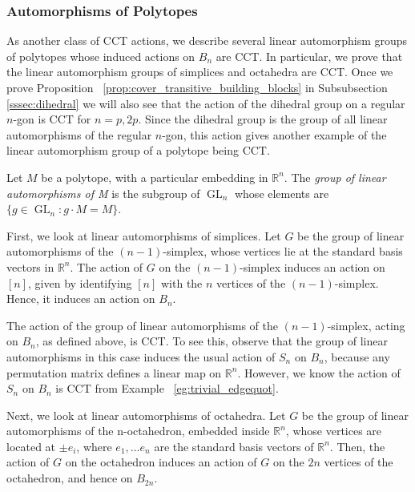 \documentclass[smallextended, envcountsame, numbook]{svjour3}
\numberwithin{equation}{section}
\newcommand\sssec{\subsubsection}
\begin{document}
\sssec{Automorphisms of Polytopes}
\label{sssec:polytopes}

As another class of CCT actions, we describe several linear automorphism groups of polytopes whose induced actions on $B_n$ are CCT. In particular, we prove that the linear automorphism groups of simplices and octahedra are CCT.
Once we prove Proposition ~\ref{prop:cover_transitive_building_blocks} in Subsubsection \ref{sssec:dihedral} we will also see that the action of the dihedral group on a regular $n$-gon is CCT for $n = p,2p$.  Since the dihedral group is the group of all linear automorphisms of the regular $n$-gon, this action gives another example of the linear automorphism group of a polytope being CCT.

\begin{definition}
Let $M$ be a polytope, with a particular embedding in $\mathbb R^n$. The {\it group of linear automorphisms of M} is the subgroup of $\operatorname{GL}_n$ whose elements are $\{g \in \operatorname{GL}_n\colon g \cdot M = M\}$.
\end{definition}

First, we look at linear automorphisms of simplices. Let $G$ be the group of linear automorphisms of the $(n-1)$-simplex, whose vertices lie at the standard basis vectors in $\mathbb R^n$. The action of $G$ on the $(n-1)$-simplex induces an action on $[n]$, given by identifying $[n]$ with the $n$ vertices of the $(n-1)$-simplex. Hence, it induces an action on $B_n$.

\begin{example}
The action of the group of linear automorphisms of the $(n-1)$-simplex, acting on $B_n$, as defined above, is CCT. To see this, observe that the group of linear automorphisms in this case induces the usual action of $S_n$ on $B_n$, because any permutation matrix defines a linear map on $\mathbb R^n$. However, we know the action of $S_n$ on $B_n$ is CCT from Example ~\ref{eg:trivial_edgequot}.
\end{example}

Next, we look at linear automorphisms of octahedra. Let $G$ be the group of linear automorphisms of the n-octahedron, embedded inside $\mathbb R^n$, whose vertices are located at $\pm e_i$, where $e_1,\ldots e_n$ are the standard basis vectors of $\mathbb R^n$. Then, the action of $G$ on the octahedron induces an action of $G$ on the $2n$ vertices of the octahedron, and hence on $B_{2n}$.
\end{document}
